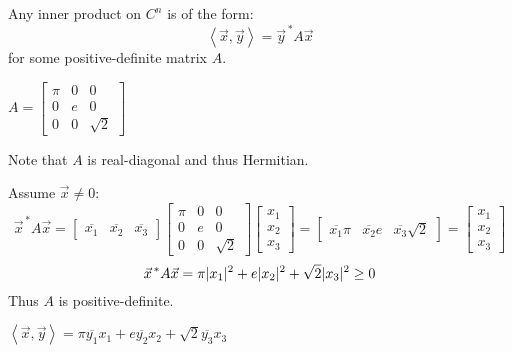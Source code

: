 \documentclass[letterpaper,12pt,fleqn]{article}
\newcommand{\inner}[2]{\left<#1,#2\right>}
\newcommand{\vx}{\vec{x}}
\newcommand{\vy}{\vec{y}}
\newcommand{\conj}[1]{\overline{#1}}
\begin{document}
\begin{theorem}
  Any inner product on $C^n$ is of the form:
  \[\inner{\vx}{\vy}=\vy^{\,*}A\vx\]
  for some positive-definite matrix $A$.
\end{theorem}

\begin{example}
  \newcommand{\MA}{
    \begin{bmatrix} \pi & 0 & 0 \\ 0 & e & 0 \\ 0 & 0 & \sqrt{2} \end{bmatrix}
  }

  $A=\MA$

  Note that $A$ is real-diagonal and thus Hermitian.

  Assume $\vx\ne0$:
  \[\vx^{\,*}A\vx=\begin{bmatrix} \conj{x_1} & \conj{x_2} & \conj{x_3} \end{bmatrix}\MA
    \begin{bmatrix} x_1 \\ x_2 \\ x_3 \end{bmatrix}=
    \begin{bmatrix} \conj{x_1}\pi & \conj{x_2}e & \conj{x_3}\sqrt{2} \end{bmatrix}=
    \begin{bmatrix} x_1 \\ x_2 \\ x_3 \end{bmatrix}\]
  \[\vx^{\,*}A\vx=\pi\abs{x_1}^2+e\abs{x_2}^2+\sqrt{2}\abs{x_3}^2\ge0\]
  Thus $A$ is positive-definite.

  $\inner{\vx}{\vy}=\pi\conj{y_1}x_1+e\conj{y_2}x_2+\sqrt{2}\conj{y_3}x_3$
\end{example}
\end{document}
